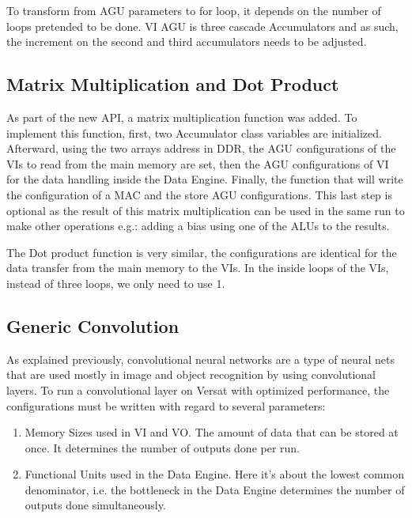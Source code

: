 \documentclass[conference]{IEEEtran}
\begin{document}
To transform from AGU parameters to for loop, it depends on the number of loops pretended to be done. VI AGU is three  cascade Accumulators
and as such, the increment on the second and third accumulators needs to be adjusted.

% 

\subsection{Matrix Multiplication and Dot Product}

As part of the new API, a matrix multiplication function was added. To implement this function, first, two Accumulator class variables are initialized.
Afterward, using the two arrays address in DDR, the AGU configurations of the VIs to read from the main memory are set, then the AGU configurations of VI for the data handling inside the Data Engine.
Finally, the function that will write the configuration of a MAC and the store AGU configurations. This last step is optional as the result of this matrix multiplication can be used in the same run
to make other operations e.g.: adding a bias using one of the ALUs to the results.

% 

The Dot product function is very similar, the configurations are identical for the data transfer from the main memory to the VIs. In the inside loops of the VIs, instead of three  loops, we only need to use 
1.

\subsection{Generic Convolution}

As explained previously, convolutional neural networks are a type of neural nets that are 
used mostly in image and object recognition by using convolutional layers. To run a convolutional layer on Versat with
optimized performance, the configurations must be written with regard to several parameters:

\begin{enumerate}
	\item Memory Sizes used in VI and VO. The amount of data that can be stored at once. It determines the number of outputs done per run.
	\item Functional Units used in the Data Engine. Here it's about the lowest common denominator, i.e. the bottleneck in the Data Engine determines the number of outputs done simultaneously.
  \end{enumerate}
 
\end{document}
